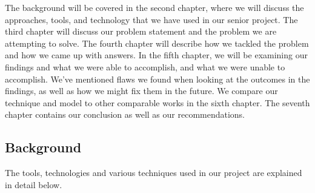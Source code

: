 \documentclass{article}
\begin{document}
The background will be covered in the second chapter, where we will discuss the approaches, tools, and technology that we have used in our senior project. The third chapter will discuss our problem statement and the problem we are attempting to solve. The fourth chapter will describe how we tackled the problem and how we came up with answers. In the fifth chapter, we will be examining our findings and what we were able to accomplish, and what we were unable to accomplish. We've mentioned flaws we found when looking at the outcomes in the findings, as well as how we might fix them in the future. We compare our technique and model to other comparable works in the sixth chapter. The seventh chapter contains our conclusion as well as our recommendations.

\begin{center}
    \item\section{Background}
\end{center}
The tools, technologies and various techniques used in our project are explained in detail below.\vspace{0.25cm}
\end{document}
